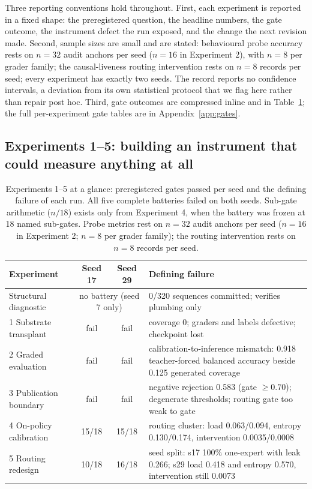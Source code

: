 \documentclass[10pt,a4paper]{article}
\newcommand{\fail}[1]{\textcolor{failred}{#1}}
\newcommand{\good}[1]{\textcolor{okgreen}{#1}}
\begin{document}
Three reporting conventions hold throughout. First, each experiment is reported in a fixed shape: the preregistered question, the headline numbers, the gate outcome, the instrument defect the run exposed, and the change the next revision made. Second, sample sizes are small and are stated: behavioural probe accuracy rests on $n=32$ audit anchors per seed ($n=16$ in Experiment 2), with $n=8$ per grader family; the causal-liveness routing intervention rests on $n=8$ records per seed; every experiment has exactly two seeds. The record reports no confidence intervals, a deviation from its own statistical protocol that we flag here rather than repair post hoc. Third, gate outcomes are compressed inline and in Table~\ref{tab:record-early}; the full per-experiment gate tables are in Appendix~\ref{app:gates}.

\subsection{Experiments 1--5: building an instrument that could measure anything at all}\label{sec:record-early}

\begin{table}[htbp]
\caption{Experiments 1--5 at a glance: preregistered gates passed per seed and the defining failure of each run. All five complete batteries failed on both seeds. Sub-gate arithmetic ($n/18$) exists only from Experiment 4, when the battery was frozen at 18 named sub-gates. Probe metrics rest on $n=32$ audit anchors per seed ($n=16$ in Experiment 2; $n=8$ per grader family); the routing intervention rests on $n=8$ records per seed.}
\label{tab:record-early}
\centering\footnotesize
\begin{tabularx}{\textwidth}{@{}lccX@{}}
\toprule
Experiment & Seed 17 & Seed 29 & Defining failure \\
\midrule
Structural diagnostic & \multicolumn{2}{c}{no battery (seed 7 only)} & 0/320 sequences committed; verifies plumbing only \\
1 Substrate transplant & \fail{fail} & \fail{fail} & coverage 0; graders and labels defective; checkpoint lost \\
2 Graded evaluation & \fail{fail} & \fail{fail} & calibration-to-inference mismatch: 0.918 teacher-forced balanced accuracy beside 0.125 generated coverage \\
3 Publication boundary & \fail{fail} & \fail{fail} & negative rejection \fail{0.583} (gate $\geq 0.70$); degenerate thresholds; routing gate too weak to gate \\
4 On-policy calibration & \fail{15/18} & \fail{15/18} & routing cluster: load \fail{0.063}/\fail{0.094}, entropy \fail{0.130}/\fail{0.174}, intervention \fail{0.0035}/\fail{0.0008} \\
5 Routing redesign & \fail{10/18} & \fail{16/18} & seed split: s17 100\% one-expert with leak \fail{0.266}; s29 load \good{0.418} and entropy \good{0.570}, intervention still \fail{0.0073} \\
\bottomrule
\end{tabularx}
\end{table}
\end{document}
